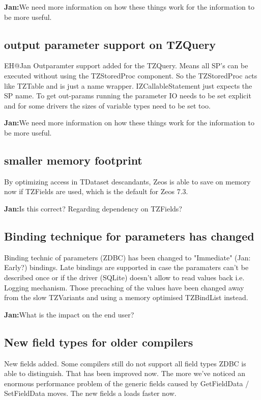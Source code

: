 \documentclass[a4paper,12pt,oneside]{article}
\begin{document}
\textbf{Jan:}We need more information on how these things work for the information to be more useful.

\subsection{output parameter support on TZQuery}
EH@Jan Outparamter support added for the TZQuery.
Means all SP's can be executed without using the TZStoredProc component.
So the TZStoredProc acts like TZTable and is just a name wrapper.
IZCallableStatement just expects the SP name.
To get out-params running the parameter IO needs to be set explicit and for some drivers the sizes of variable types need to be set too.

\textbf{Jan:}We need more information on how these things work for the information to be more useful.

\subsection{smaller memory footprint}
By optimizing access in TDataset descandants, Zeos is able to save on memory now if TZFields are used, which is the default for Zeos 7.3.

\textbf{Jan:}Is this correct? Regarding dependency on TZFields?

\subsection{Binding technique for parameters has changed}

Binding technic of parameters (ZDBC) has been changed to "Immediate" (Jan: Early?) bindings.
Late bindings are supported in case the paramaters can't be described once or if the driver (SQLite) doesn't allow to read values back i.e. Logging mechanism.
Those precaching of the values have been changed away from the slow TZVariants and using a memory optimised TZBindList instead.

\textbf{Jan:}What is the impact on the end user?

\subsection{New field types for older compilers}
New fields added.
Some compilers still do not support all field types ZDBC is able to distinguish.
That has been improved now.
The more we've noticed an enormous performance problem of the generic fields caused by GetFieldData / SetFieldData moves.
The new fields a loads faster now.
\end{document}
